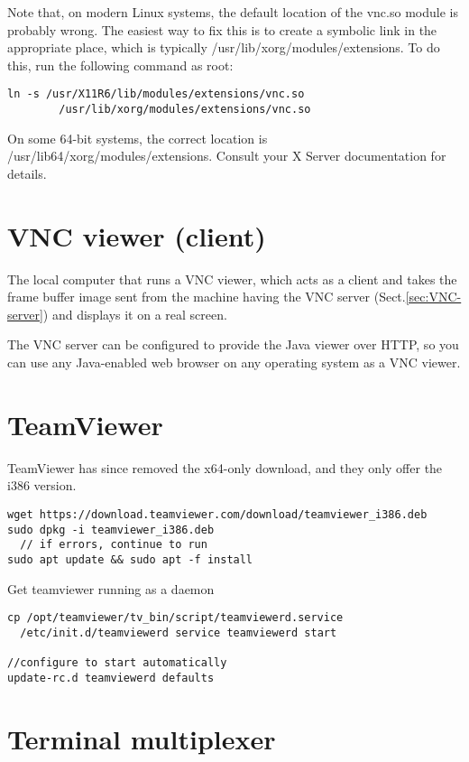 Note that, on modern Linux systems, the default location of the vnc.so module is
probably wrong. The easiest way to fix this is to create a symbolic link in the
appropriate place, which is typically /usr/lib/xorg/modules/extensions. To do
this, run the following command as root:    

\begin{verbatim}
ln -s /usr/X11R6/lib/modules/extensions/vnc.so
        /usr/lib/xorg/modules/extensions/vnc.so
\end{verbatim}
On some 64-bit systems, the correct location is
/usr/lib64/xorg/modules/extensions. Consult your X Server documentation for details. 

\section{VNC viewer (client)}
\label{sec:VNC-client}

The local computer that runs a VNC viewer, which acts as a client and takes the
frame buffer image sent from the machine having the VNC server
(Sect.\ref{sec:VNC-server}) and displays it on a real screen.

The VNC server can be configured to provide the Java viewer over HTTP, so you
can use any Java-enabled web browser on any operating system as a VNC viewer.


\section{TeamViewer}
\label{sec:TeamViewer}

TeamViewer has since removed the x64-only download, and they only offer the i386
version.
\begin{verbatim}
wget https://download.teamviewer.com/download/teamviewer_i386.deb
sudo dpkg -i teamviewer_i386.deb
  // if errors, continue to run
sudo apt update && sudo apt -f install
\end{verbatim}

Get teamviewer running as a daemon
\begin{verbatim}
cp /opt/teamviewer/tv_bin/script/teamviewerd.service
  /etc/init.d/teamviewerd service teamviewerd start 

//configure to start automatically
update-rc.d teamviewerd defaults
\end{verbatim}


\section{Terminal multiplexer}
\label{sec:terminal_multiplexer}


